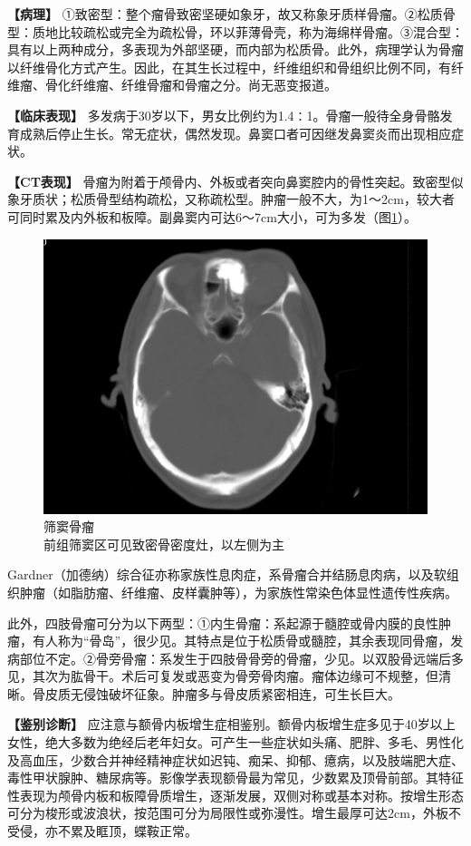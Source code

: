 \textbf{【病理】}
①致密型：整个瘤骨致密坚硬如象牙，故又称象牙质样骨瘤。②松质骨型：质地比较疏松或完全为疏松骨，环以菲薄骨壳，称为海绵样骨瘤。③混合型：具有以上两种成分，多表现为外部坚硬，而内部为松质骨。此外，病理学认为骨瘤以纤维骨化方式产生。因此，在其生长过程中，纤维组织和骨组织比例不同，有纤维瘤、骨化纤维瘤、纤维骨瘤和骨瘤之分。尚无恶变报道。

\textbf{【临床表现】}
多发病于30岁以下，男女比例约为1.4∶1。骨瘤一般待全身骨骼发育成熟后停止生长。常无症状，偶然发现。鼻窦口者可因继发鼻窦炎而出现相应症状。

\textbf{【CT表现】}
骨瘤为附着于颅骨内、外板或者突向鼻窦腔内的骨性突起。致密型似象牙质状；松质骨型结构疏松，又称疏松型。肿瘤一般不大，为1～2cm，较大者可同时累及内外板和板障。副鼻窦内可达6～7cm大小，可为多发（图\ref{fig22-16}）。

\begin{figure}[!htbp]
 \centering
 \includegraphics[width=.7\textwidth,height=\textheight,keepaspectratio]{./images/Image00435.jpg}
 \captionsetup{justification=centering}
 \caption{筛窦骨瘤\\{\small 前组筛窦区可见致密骨密度灶，以左侧为主}}
 \label{fig22-16}
  \end{figure} 

Gardner（加德纳）综合征亦称家族性息肉症，系骨瘤合并结肠息肉病，以及软组织肿瘤（如脂肪瘤、纤维瘤、皮样囊肿等），为家族性常染色体显性遗传性疾病。

此外，四肢骨瘤可分为以下两型：①内生骨瘤：系起源于髓腔或骨内膜的良性肿瘤，有人称为“骨岛”，很少见。其特点是位于松质骨或髓腔，其余表现同骨瘤，发病部位不定。②骨旁骨瘤：系发生于四肢骨骨旁的骨瘤，少见。以双股骨远端后多见，其次为肱骨干。术后可复发或恶变为骨旁骨肉瘤。瘤体边缘可不规整，但清晰。骨皮质无侵蚀破坏征象。肿瘤多与骨皮质紧密相连，可生长巨大。

\textbf{【鉴别诊断】}
应注意与额骨内板增生症相鉴别。额骨内板增生症多见于40岁以上女性，绝大多数为绝经后老年妇女。可产生一些症状如头痛、肥胖、多毛、男性化及高血压，少数合并神经精神症状如迟钝、痴呆、抑郁、癔病，以及肢端肥大症、毒性甲状腺肿、糖尿病等。影像学表现额骨最为常见，少数累及顶骨前部。其特征性表现为颅骨内板和板障骨质增生，逐渐发展，双侧对称或基本对称。按增生形态可分为梭形或波浪状，按范围可分为局限性或弥漫性。增生最厚可达2cm，外板不受侵，亦不累及眶顶，蝶鞍正常。

